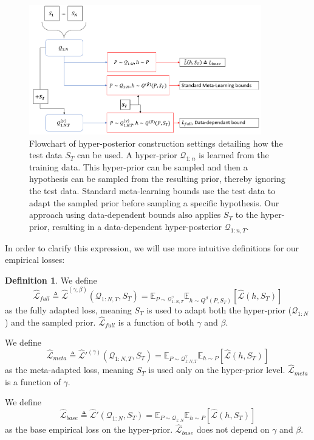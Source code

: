\documentclass{article}
\theoremstyle{definition}
\newtheorem{defn}{Definition}[section]
\begin{document}
\begin{figure}
	\centering
	\includegraphics[width=0.9\textwidth]{data_dependant_adaptation.PNG}
	\caption{Flowchart of hyper-posterior construction settings detailing how the test data $S_T$ can be used. A hyper-prior $\mathcal{Q}_{1:n}$ is learned from the training data. This hyper-prior can be sampled and then a hypothesis can be sampled from the resulting prior, thereby ignoring the test data. Standard meta-learning bounds use the test data to adapt the sampled prior before sampling a specific hypothesis. Our approach using data-dependent bounds also applies $S_T$ to the hyper-prior, resulting in a data-dependent hyper-posterior $\mathcal{Q}_{1:n, T}$. }
	\label{fig:data_dependant_bound}
\end{figure}

In order to clarify this expression, we will use more intuitive definitions for our empirical losses:
\begin{defn}
	We define $$\hat{\mathcal{L}}_{full}\triangleq \hat{\mathcal{L}}^{(\gamma,\beta)}(\mathcal{Q}_{1:N,T}, S_T)=\mathbb{E}_{P\sim \mathcal{Q}^{\gamma}_{1:N,T}}\mathbb{E}_{h\sim Q^{\beta}(P,S_T)}\left [\hat{\mathcal{L}}(h, S_T)\right ]$$ as the fully adapted loss, meaning $S_T$ is used to adapt both the hyper-prior ($\mathcal{Q}_{1:N}$) and the sampled prior. $\hat{\mathcal{L}}_{full}$ is a function of both $\gamma$ and $\beta$.
	
	We define $$\hat{\mathcal{L}}_{meta}\triangleq \hat{\mathcal{L}}'^{(\gamma)}(\mathcal{Q}_{1:N,T}, S_T)=\mathbb{E}_{P\sim \mathcal{Q}^{\gamma}_{1:N,T}}\mathbb{E}_{h\sim P}\left [\hat{\mathcal{L}}(h, S_T)\right ]$$ 
	as the meta-adapted loss, meaning $S_T$ is used only on the hyper-prior level. $\hat{\mathcal{L}}_{meta}$ is a function of $\gamma$.
	
	We define $$\hat{\mathcal{L}}_{base}\triangleq \hat{\mathcal{L}}'(\mathcal{Q}_{1:N}, S_T)=\mathbb{E}_{P\sim \mathcal{Q}_{1:N}}\mathbb{E}_{h\sim P}\left [\hat{\mathcal{L}}(h, S_T)\right ]$$ as the base empirical loss on the hyper-prior. $\hat{\mathcal{L}}_{base}$ does not depend on $\gamma$ and $\beta$.
\end{defn}
\end{document}
